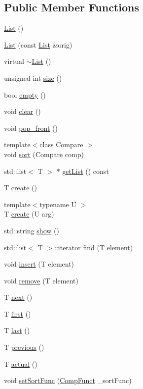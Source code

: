 \subsection*{Public Member Functions}
\begin{DoxyCompactItemize}
\item 
\hyperlink{class_list_a5c5e27671b21b3815d4e25b953c69454}{List} ()
\item 
\hyperlink{class_list_a46e402e625d805b8ccb565129d4d9680}{List} (const \hyperlink{class_list}{List} \&orig)
\item 
virtual \hyperlink{class_list_a2b58189090f6e5ce52939c9195e59e85}{$\sim$\+List} ()
\item 
unsigned int \hyperlink{class_list_ad908ab5cf19370fcdf61cf1927e5e8f5}{size} ()
\item 
bool \hyperlink{class_list_a3737ca60365287ce663393d8c07d1a41}{empty} ()
\item 
void \hyperlink{class_list_ae296516a252e11963dbf963727ce429a}{clear} ()
\item 
void \hyperlink{class_list_a024af4543f71544345351a45850c42d8}{pop\+\_\+front} ()
\item 
{\footnotesize template$<$class Compare $>$ }\\void \hyperlink{class_list_af5bf0ad4812b1a9da9eb20a4646e3e96}{sort} (Compare comp)
\item 
std\+::list$<$ T $>$ $\ast$ \hyperlink{class_list_a570498345450f635b72d1ca2675145cc}{get\+List} () const 
\item 
T \hyperlink{class_list_a3439065c3222c241427e9deb6adf1b01}{create} ()
\item 
{\footnotesize template$<$typename U $>$ }\\T \hyperlink{class_list_a767b6b53a19368f4623d72cea74f9c7b}{create} (U arg)
\item 
std\+::string \hyperlink{class_list_a8f30a708a550bcca33f64dc6fea8affa}{show} ()
\item 
std\+::list$<$ T $>$\+::iterator \hyperlink{class_list_a2f50d3342e016ec57876798ad4e8bf31}{find} (T element)
\item 
void \hyperlink{class_list_a518d00fd77740525522949d4316e8826}{insert} (T element)
\item 
void \hyperlink{class_list_a0ac08f7f3dad900b99e9a73e76d2beee}{remove} (T element)
\item 
T \hyperlink{class_list_a2dce655743c2b6c7cc7c9b6034badf78}{next} ()
\item 
T \hyperlink{class_list_a42761114ff6730da1402089d4bd3f795}{first} ()
\item 
T \hyperlink{class_list_a9944c09ee1bd6390bbf017be5c858063}{last} ()
\item 
T \hyperlink{class_list_ab43f87321c901694807e6c9315a72cd0}{previous} ()
\item 
T \hyperlink{class_list_a58474bac3aa3d1ef7208aa06a3789d57}{actual} ()
\item 
void \hyperlink{class_list_a31a37746c0d960f2f2bb4071b2735c5e}{set\+Sort\+Func} (\hyperlink{class_list_ae43380038701ec3a2fbecaf31f37dd19}{Comp\+Funct} \+\_\+sort\+Func)
\end{DoxyCompactItemize}


